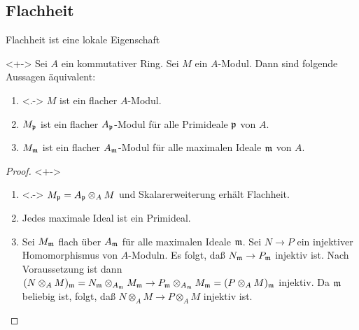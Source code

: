 \subsection{Flachheit}

\begin{frame}{Flachheit ist eine lokale Eigenschaft}
	\begin{proposition}<+->
		Sei \(A\) ein kommutativer Ring. Sei \(M\) ein \(A\)-Modul. Dann sind folgende Aussagen äquivalent:
		\begin{enumerate}[<+->]
		\item<.->
			\(M\) ist ein flacher \(A\)-Modul.
		\item
			\(M_{\mathfrak{p}}\) ist ein flacher \(A_{\mathfrak{p}}\)-Modul für alle Primideale \(\mathfrak{p}\) von \(A\).
		\item
			\(M_{\mathfrak{m}}\) ist ein flacher \(A_{\mathfrak{m}}\)-Modul für alle maximalen Ideale \(\mathfrak{m}\) von \(A\).
		\end{enumerate}
	\end{proposition}
	\begin{proof}<+->
		\begin{enumerate}[<+->]
		\item<.->
			\(M_{\mathfrak{p}} = A_{\mathfrak{p}} \otimes_A M\) und
			Skalarerweiterung erhält Flachheit.
		\item
			Jedes maximale Ideal ist ein Primideal.
		\item
			Sei \(M_{\mathfrak{m}}\) flach über \(A_{\mathfrak{m}}\) für alle maximalen Ideale \(\mathfrak{m}\). Sei \(N \to P\) ein
			injektiver Homomorphismus von \(A\)-Moduln. Es folgt, daß \(N_{\mathfrak{m}} \to P_{\mathfrak{m}}\) injektiv ist.
			Nach Voraussetzung ist dann \((N \otimes_A M)_{\mathfrak{m}} = N_{\mathfrak{m}} \otimes_{A_{\mathfrak{m}}} M_{\mathfrak{m}} \to
			P_{\mathfrak{m}} \otimes_{A_{\mathfrak{m}}} M_{\mathfrak{m}} = (P \otimes_A M)_{\mathfrak{m}}\) injektiv. 
			Da \(\mathfrak{m}\) beliebig ist, folgt, daß \(N \otimes_A M \to P \otimes_A M\) injektiv ist.
			\qedhere
		\end{enumerate}
	\end{proof}
\end{frame}

